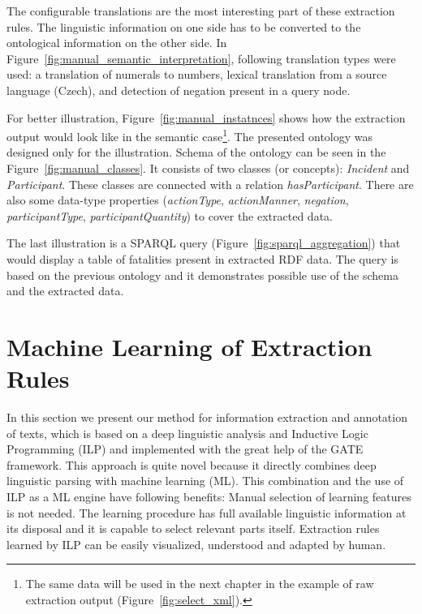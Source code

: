 The configurable translations are the most interesting part of these extraction rules. The linguistic information on one side has to be converted to the ontological information on the other side. In Figure~\ref{fig:manual_semantic_interpretation}, following translation types were used: a translation of numerals to numbers, lexical translation from a source language (Czech), and detection of negation present in a query node.

For better illustration, Figure~\ref{fig:manual_instatnces} shows how the extraction output would look like in the semantic case\footnote{The same data will be used in the next chapter in the example of raw extraction output (Figure~\ref{fig:select_xml}).}. The presented ontology was designed only for the illustration. Schema of the ontology can be seen in the Figure~\ref{fig:manual_classes}. It consists of two classes (or concepts): \emph{Incident} and \emph{Participant}. These classes are connected with a relation \emph{hasParticipant}. There are also some data-type properties (\emph{actionType}, \emph{actionManner}, \emph{negation}, \emph{participantType}, \emph{participantQuantity}) to cover the extracted data. 

The last illustration is a SPARQL query (Figure~\ref{fig:sparql_aggregation}) that would display a table of fatalities present in extracted RDF data. The query is based on the previous ontology and it demonstrates possible use of the schema and the extracted data.







\section{Machine Learning of Extraction Rules} \label{sec:learning_methods} \graphicspath{{../img/ch60/}}

In this section we present %
our method for information extraction and annotation of texts, which is based on a deep linguistic analysis and Inductive Logic Programming (ILP) and implemented with the great help of the GATE framework. This approach is quite novel because it directly combines deep linguistic parsing with machine learning (ML). This combination and the use of ILP as a ML engine have following benefits: Manual selection of learning features is not needed. 
The learning procedure has full available linguistic information at its disposal and it is capable to select relevant parts itself. Extraction rules learned by ILP can be easily visualized, understood and adapted by human.


